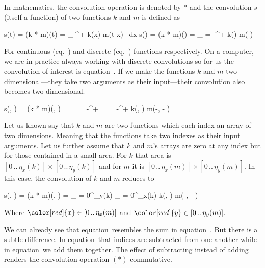 In mathematics, the convolution operation is denoted by $*$ and the convolution $s$ (itself a function) of two functions $k$ and $m$ is defined as

\startplaceformula[reference=cont-conv]
\startformula
s(t) = (k * m)(t) = \int_{{-}\infty}^{{+}\infty} k(x) \cdot m(t-x) \, {\rm d}x
\stopformula
\stopplaceformula
\startplaceformula[reference=disc-conv]
\startformula
s(\color[red]{x}) = (k * m)(\color[red]{x}) = \sum_{\color[blue]{x'} = {-}\infty}^{{+}\infty} k(\color[blue]{x'}) \cdot m(\color[red]{x}-\color[blue]{x'})
\stopformula
\stopplaceformula

For continuous (eq.~) and discrete (eq.~) functions respectively.
On a computer, we are in practice always working with discrete convolutions so for us the convolution of interest is equation~.
If we make the functions $k$ and $m$ two dimensional---they take two arguments as their input---their convolution also becomes two dimensional.

\startplaceformula[reference=twodim-disc-conv]
\startformula
s(\color[red]{x}, \color[red]{y}) = (k * m)(\color[red]{x}, \color[red]{y}) =
\sum_{\color[blue]{y'} = {-}\infty}^{{+}\infty}
\sum_{\color[blue]{x'} = {-}\infty}^{{+}\infty}
k(\color[blue]{x'}, \color[blue]{y'}) \cdot m(\color[red]{x}-\color[blue]{x'}, \color[red]{y} - \color[blue]{y'})
\stopformula
\stopplaceformula

\indentation
Let us known say that $k$ and $m$ are two functions which each index an array of two dimensions.
Meaning that the functions take two indexes as their input arguments.
Let us further assume that $k$ and $m$'s arrays are zero at any index but for those contained in a small area.
For $k$ that area is $[0 \, .. \, \eta_x(k)] \times [0 \, .. \, \eta_y(k)]$ and for $m$ it is $[0 \, .. \, \eta_x(m)] \times [0 \, .. \, \eta_y(m)]$.
In this case, the convolution of $k$ and $m$ reduces to

\startplaceformula[reference=twodim-disc-conv-finite]
\startformula
s(\color[red]{x}, \color[red]{y}) = (k * m)(\color[red]{x}, \color[red]{y}) = 
\sum_{\color[blue]{y'} = 0}^{\eta_y(k)} 
\sum_{\color[blue]{x'} = 0}^{\eta_x(k)} 
k(\color[blue]{x'}, \color[blue]{y'}) \cdot m(\color[red]{x}-\color[blue]{x'}, \color[red]{y} - \color[blue]{y'})
\stopformula
\stopplaceformula

Where $\color[red]{x} \in [0 \, .. \, \eta_x(m)]$ and $\color[red]{y} \in [0 \, .. \, \eta_y(m)]$.

We can already see that equation~ resembles the  sum in equation~.
But there is a subtle difference.
In equation~ that indices are subtracted from one another while in equation~ we add them together.
The effect of subtracting instead of adding renders the convolution operation $(*)$ commutative.

